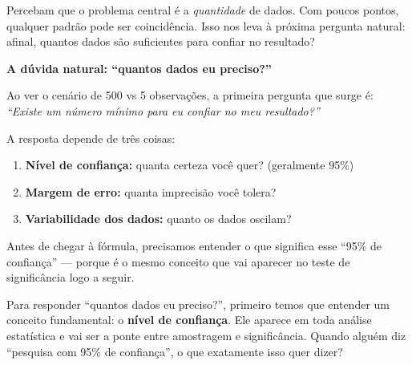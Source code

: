 Percebam que o problema central é a \emph{quantidade} de dados.
Com poucos pontos, qualquer padrão pode ser coincidência.
Isso nos leva à próxima pergunta natural: afinal, quantos dados
são suficientes para confiar no resultado?

\begin{SolvedBox}
\textbf{A dúvida natural: ``quantos dados eu preciso?''}

Ao ver o cenário de 500 vs 5 observações, a primeira pergunta que
surge é: \textit{``Existe um número mínimo para eu confiar no meu resultado?''}

A resposta depende de três coisas:
\begin{enumerate}
  \item \textbf{Nível de confiança:} quanta certeza você quer? (geralmente 95\%)
  \item \textbf{Margem de erro:} quanta imprecisão você tolera?
  \item \textbf{Variabilidade dos dados:} quanto os dados oscilam?
\end{enumerate}

Antes de chegar à fórmula, precisamos entender o que significa
esse ``95\% de confiança'' — porque é o mesmo conceito que vai aparecer
no teste de significância logo a seguir.
\end{SolvedBox}

Para responder ``quantos dados eu preciso?'', primeiro temos que
entender um conceito fundamental: o \textbf{nível de confiança}.
Ele aparece em toda análise estatística e vai ser a ponte entre
amostragem e significância.
Quando alguém diz ``pesquisa com 95\% de confiança'', o que exatamente
isso quer dizer?

